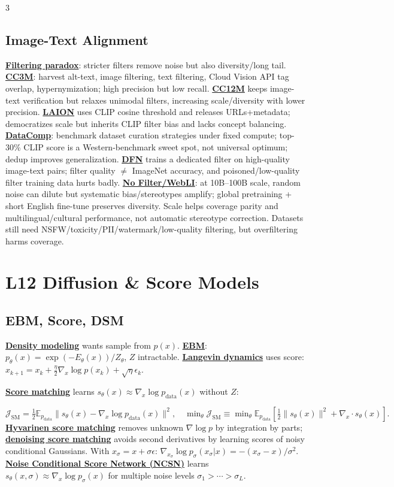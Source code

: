\documentclass{article}
\numberwithin{equation}{subsection}
\newcommand{\lowterm}[1]{\textbf{\underline{#1}}}
\newcommand{\E}{\mathbb{E}}
\begin{document}
\begin{multicols*}{3}
\subsection{Image-Text Alignment}
\lowterm{Filtering paradox}: stricter filters remove noise but also diversity/long tail. \lowterm{CC3M}: harvest alt-text, image filtering, text filtering, Cloud Vision API tag overlap, hypernymization; high precision but low recall. \lowterm{CC12M} keeps image-text verification but relaxes unimodal filters, increasing scale/diversity with lower precision. \lowterm{LAION} uses CLIP cosine threshold and releases URLs+metadata; democratizes scale but inherits CLIP filter bias and lacks concept balancing. \lowterm{DataComp}: benchmark dataset curation strategies under fixed compute; top-30\% CLIP score is a Western-benchmark sweet spot, not universal optimum; dedup improves generalization. \lowterm{DFN} trains a dedicated filter on high-quality image-text pairs; filter quality $\ne$ ImageNet accuracy, and poisoned/low-quality filter training data hurts badly. \lowterm{No Filter/WebLI}: at 10B--100B scale, random noise can dilute but systematic bias/stereotypes amplify; global pretraining + short English fine-tune preserves diversity. Scale helps coverage parity and multilingual/cultural performance, not automatic stereotype correction. Datasets still need NSFW/toxicity/PII/watermark/low-quality filtering, but overfiltering harms coverage.

\section{L12 Diffusion \& Score Models}
\subsection{EBM, Score, DSM}
\lowterm{Density modeling} wants sample from $p(x)$. \lowterm{EBM}: $p_\theta(x)=\exp(-E_\theta(x))/Z_\theta$, $Z$ intractable. \lowterm{Langevin dynamics} uses score:
\(
x_{k+1}=x_k+\frac{\eta}{2}\nabla_x\log p(x_k)+\sqrt{\eta}\epsilon_k.
\)

\lowterm{Score matching} learns $s_\theta(x)\approx\nabla_x\log p_{\text{data}}(x)$ without $Z$:

\(
\mathcal J_{\mathrm{SM}}
=\frac12\E_{p_{\text{data}}}\|s_\theta(x)-\nabla_x\log p_{\text{data}}(x)\|^2,\quad
\min_\theta\mathcal J_{\mathrm{SM}}
\equiv \min_\theta\E_{p_{\text{data}}}\left[\frac12\|s_\theta(x)\|^2+\nabla_x\cdot s_\theta(x)\right].
\)
\lowterm{Hyvarinen score matching} removes unknown $\nabla\log p$ by integration by parts; \lowterm{denoising score matching} avoids second derivatives by learning scores of noisy conditional Gaussians. With $x_\sigma=x+\sigma\epsilon$:
\(
\nabla_{x_\sigma}\log p_\sigma(x_\sigma|x)=-(x_\sigma-x)/\sigma^2.
\)
\lowterm{Noise Conditional Score Network (NCSN)} learns $s_\theta(x,\sigma)\approx\nabla_x\log p_\sigma(x)$ for multiple noise levels $\sigma_1>\cdots>\sigma_L$. 


\end{multicols*}
\end{document}
